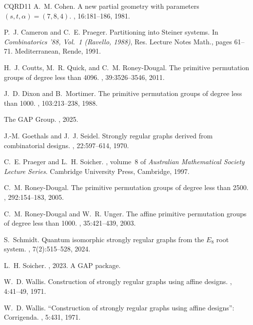 \documentclass[a4paper]{article}
\theoremstyle{definition}
\begin{document}
\begin{thebibliography}{CQRD11}
A.~M. Cohen.
\newblock A new partial geometry with parameters $(s,t,\alpha)=(7,8,4)$.
, 16:181--186, 1981.

P.~J. Cameron and C.~E. Praeger.
\newblock Partitioning into {S}teiner systems.
\newblock In {\em Combinatorics '88, {V}ol.\ 1 ({R}avello, 1988)}, Res. Lecture Notes Math., pages 61--71. Mediterranean, Rende, 1991.

H.~J. Coutts, M.~R. Quick, and C.~M. Roney-Dougal.
\newblock The primitive permutation groups of degree less than 4096.
, 39:3526--3546, 2011.

J.~D. Dixon and B.~Mortimer.
\newblock The primitive permutation groups of degree less than 1000.
, 103:213--238, 1988.

The GAP Group.
, 2025.

J.-M. Goethals and J.~J. Seidel.
\newblock Strongly regular graphs derived from combinatorial designs.
, 22:597--614, 1970.

C.~E. Praeger and L.~H. Soicher.
, volume~8 of {\em Australian Mathematical Society Lecture Series}.
\newblock Cambridge University Press, Cambridge, 1997.

C.~M. Roney-Dougal.
\newblock The primitive permutation groups of degree less than 2500.
, 292:154--183, 2005.

C.~M. Roney-Dougal and W.~R. Unger.
\newblock The affine primitive permutation groups of degree less than 1000.
, 35:421--439, 2003.

S.~Schmidt.
\newblock Quantum isomorphic strongly regular graphs from the {$E_8$} root system.
, 7(2):515--528, 2024.

L.~H. Soicher.
, 2023.
\newblock A GAP package.

W.~D. Wallis.
\newblock Construction of strongly regular graphs using affine designs.
, 4:41--49, 1971.

W.~D. Wallis.
\newblock ``{C}onstruction of strongly regular graphs using affine designs'': {C}orrigenda.
, 5:431, 1971.

\end{thebibliography}
\end{document}
